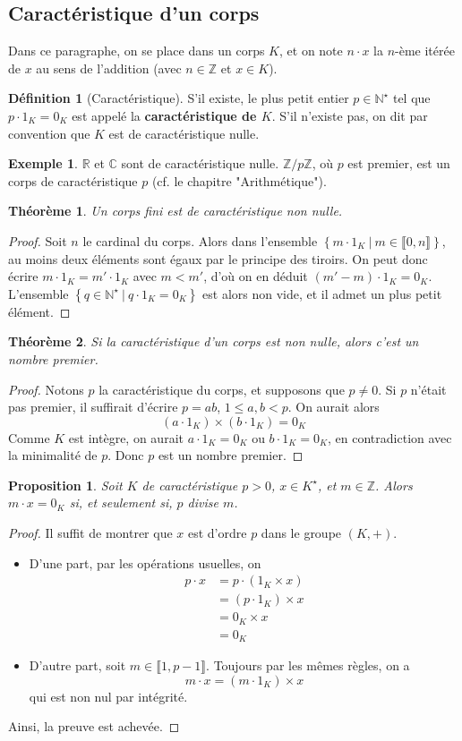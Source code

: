 \documentclass[french]{book}
\newcommand{\N}{\mathbb{N}}
\newcommand{\Z}{\mathbb{Z}}
\newcommand{\R}{\mathbb{R}}
\newcommand{\C}{\mathbb{C}}
\newcommand{\st}{^\star}
\theoremstyle{plain}
\newtheorem{thm}{Théorème}[chapter]
\newtheorem{prop}{Proposition}[chapter]
\theoremstyle{definition}
\newtheorem{dfn}{Définition}[chapter]
\newtheorem{exa}{Exemple}[chapter]
\theoremstyle{remark}
\begin{document}
\subsection{Caractéristique d'un corps}
Dans ce paragraphe, on se place dans un corps $K$, et on note $n\cdot x$ la $n$-ème itérée de $x$ au sens de l'addition (avec $n\in\Z$ et $x\in K$).
\begin{dfn}[Caractéristique]
	S'il existe, le plus petit entier $p\in\N\st$ tel que $p\cdot 1_K=0_K$ est appelé la \textbf{caractéristique de $K$}. S'il n'existe pas, on dit par convention que $K$ est de caractéristique nulle.
\end{dfn}
\begin{exa}
	$\R$ et $\C$ sont de caractéristique nulle. $\Z/p\Z$, où $p$ est premier, est un corps de caractéristique $p$ (cf. le chapitre "Arithmétique").
\end{exa}
\begin{thm}
	Un corps fini est de caractéristique non nulle.
\end{thm}
\begin{proof}
	Soit $n$ le cardinal du corps. Alors dans l'ensemble $\left\{m\cdot 1_K \ | \ m\in\llbracket0,n\rrbracket\right\}$, au moins deux éléments sont égaux par le principe des tiroirs. On peut donc écrire $m\cdot1_K=m'\cdot1_K$ avec $m<m'$, d'où on en déduit $(m'-m)\cdot1_K=0_K$. L'ensemble $\left\{q\in\N\st\ | \ q\cdot1_K=0_K\right\}$ est alors non vide, et il admet un plus petit élément. 
\end{proof}
\begin{thm}
	Si la caractéristique d'un corps est non nulle, alors c'est un nombre premier.
\end{thm}
\begin{proof}
	Notons $p$ la caractéristique du corps, et supposons que $p\ne0$. Si $p$ n'était pas premier, il suffirait d'écrire $p=ab$, $1\leqslant a,b <p$. On aurait alors $$(a\cdot1_K)\times(b\cdot1_K)=0_K$$ Comme $K$ est intègre, on aurait $a\cdot1_K=0_K$ ou $b\cdot1_K=0_K$, en contradiction avec la minimalité de $p$. Donc $p$ est un nombre premier.
\end{proof}
\begin{prop}
	Soit $K$ de caractéristique $p>0$, $x\in K\st$, et $m\in\Z$. Alors $m\cdot x=0_K$ si, et seulement si, $p$ divise $m$.
\end{prop}
\begin{proof}
	Il suffit de montrer que $x$ est d'ordre $p$ dans le groupe $(K,+)$.
	\begin{itemize}
		\item D'une part, par les opérations usuelles, on 
		\begin{align*}
			p\cdot x&=p\cdot(1_K\times x) \\
			&= (p\cdot1_K)\times x \\
			&=0_K\times x \\
			&= 0_K
		\end{align*}
		\item D'autre part, soit $m\in\llbracket1,p-1\rrbracket$. Toujours par les mêmes règles, on a $$m\cdot x=(m\cdot1_K)\times x$$ qui est non nul par intégrité.
	\end{itemize}
Ainsi, la preuve est achevée.
\end{proof}
\newpage
\end{document}
